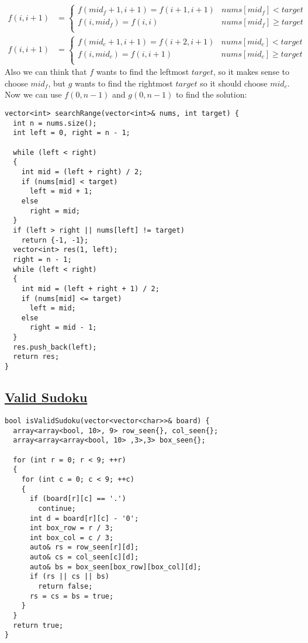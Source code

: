 \documentclass{book}
\begin{document}
	\begin{equation*}
		\begin{split}
			f(i, i + 1) &= \begin{cases}
				f(mid_f + 1, i + 1) = f(i + 1, i + 1) & nums[mid_f] < target \\
				f(i, mid_f) = f(i, i) & nums[mid_f] \ge target \\
			\end{cases} \\
			f(i, i + 1) &= \begin{cases}
				f(mid_c + 1, i + 1) = f(i + 2, i + 1) & nums[mid_c] < target \\
				f(i, mid_c) = f(i, i + 1) & nums[mid_c] \ge target \\
			\end{cases}
		\end{split}
	\end{equation*}
	Also we can think that $f$ wants to find the leftmost $target$, so it makes sense to choose $mid_f$, but $g$ wants to find the rightmost $target$ so it should choose $mid_c$. Now we can use $f(0, n - 1)$ and $g(0, n - 1)$ to find the solution:
	\begin{lstlisting}
vector<int> searchRange(vector<int>& nums, int target) {
  int n = nums.size();
  int left = 0, right = n - 1;
  
  while (left < right)
  {
    int mid = (left + right) / 2;
    if (nums[mid] < target)
      left = mid + 1;
    else
      right = mid;
  }
  if (left > right || nums[left] != target)
    return {-1, -1};
  vector<int> res(1, left);
  right = n - 1;
  while (left < right)
  {
    int mid = (left + right + 1) / 2;
    if (nums[mid] <= target)
      left = mid;
    else
      right = mid - 1;
  }
  res.push_back(left);
  return res;
}
	\end{lstlisting}
	\subsection{\href{https://leetcode.com/problems/valid-sudoku/}{Valid Sudoku}}
	\begin{lstlisting}
bool isValidSudoku(vector<vector<char>>& board) {
  array<array<bool, 10>, 9> row_seen{}, col_seen{};
  array<array<array<bool, 10> ,3>,3> box_seen{};

  for (int r = 0; r < 9; ++r)
  {
    for (int c = 0; c < 9; ++c)
    {
      if (board[r][c] == '.')
        continue;
      int d = board[r][c] - '0';
      int box_row = r / 3;
      int box_col = c / 3;
      auto& rs = row_seen[r][d];
      auto& cs = col_seen[c][d];
      auto& bs = box_seen[box_row][box_col][d];
      if (rs || cs || bs)
        return false;
      rs = cs = bs = true;
    }
  }
  return true;
}
	\end{lstlisting}
\end{document}
